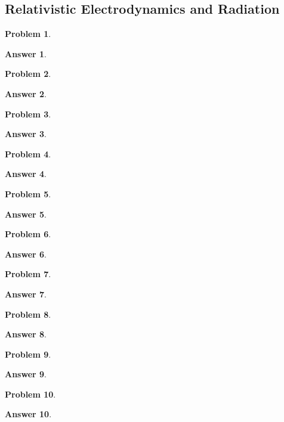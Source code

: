 \documentclass[a4paper]{article}
\newtheorem{ans}{Answer}
\theoremstyle{new}
\newtheorem{qns}{Problem}
\begin{document}
\subsection*{Relativistic Electrodynamics and Radiation}
\begin{qns}

\end{qns}
\begin{ans}

\end{ans}
\begin{qns}

\end{qns}
\begin{ans}

\end{ans}
\newpage
\begin{qns}

\end{qns}
\begin{ans}

\end{ans}
\begin{qns}

\end{qns}
\begin{ans}

\end{ans}
\newpage
\begin{qns}

\end{qns}
\begin{ans}

\end{ans}
\begin{qns}

\end{qns}
\begin{ans}

\end{ans}
\newpage
\begin{qns}

\end{qns}
\begin{ans}

\end{ans}
\begin{qns}

\end{qns}
\begin{ans}

\end{ans}
\newpage
\begin{qns}

\end{qns}
\begin{ans}

\end{ans}
\begin{qns}

\end{qns}
\begin{ans}

\end{ans}
\end{document}
